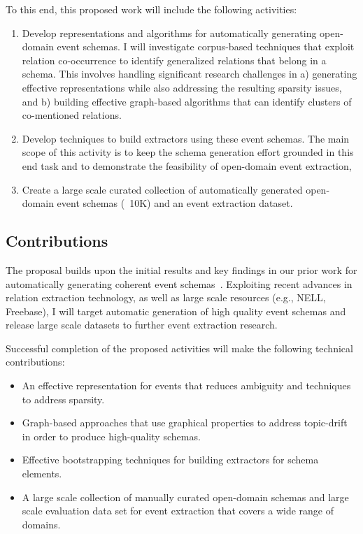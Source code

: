 To this end, this proposed work will include the following activities:
\begin{enumerate}
\item Develop representations and algorithms for automatically generating open-domain event schemas. I will investigate corpus-based techniques that exploit relation co-occurrence to identify generalized relations that belong in a schema. This involves handling significant research challenges in a) generating effective representations while also addressing the resulting sparsity issues, and b) building effective graph-based algorithms that can identify clusters of co-mentioned relations. 
\item Develop techniques to build extractors using these event schemas. The main scope of this activity is to keep the schema generation effort grounded in this end task and to demonstrate the feasibility of open-domain event extraction, 
\item Create a large scale curated collection of automatically generated open-domain event schemas (~10K) and an event extraction dataset.
\end{enumerate}

\subsection{Contributions}
The proposal builds upon the initial results and key findings in our prior work for automatically generating coherent event schemas~\cite{balasubramanian-akbc12,balasubramanian2013generating}. Exploiting recent advances in relation extraction technology, as well as large scale resources (e.g., NELL, Freebase), I will target automatic generation of high quality event schemas and release large scale datasets to further event extraction research. 

Successful completion of the proposed activities will make the following technical contributions:
\begin{itemize}[noitemsep,nolistsep]
\item An effective representation for events that reduces ambiguity and techniques to address sparsity.
\item Graph-based approaches that use graphical properties to address topic-drift in order to produce high-quality schemas.
\item Effective bootstrapping techniques for building extractors for schema elements.
\item  A large scale collection of manually curated open-domain schemas and large scale evaluation data set for event extraction that covers a wide range of domains.
\end{itemize}
\newpage


